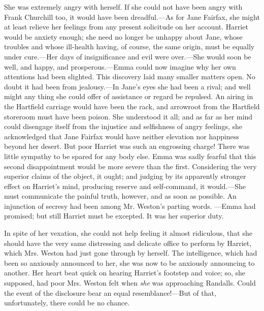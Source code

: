 She was extremely angry with herself. If she could not have been angry with Frank Churchill too, it would have been dreadful.---As for Jane Fairfax, she might at least relieve her feelings from any present solicitude on her account. Harriet would be anxiety enough; she need no longer be unhappy about Jane, whose troubles and whose ill-health having, of course, the same origin, must be equally under cure.---Her days of insignificance and evil were over.---She would soon be well, and happy, and prosperous.---Emma could now imagine why her own attentions had been slighted. This discovery laid many smaller matters open. No doubt it had been from jealousy.---In Jane's eyes she had been a rival; and well might any thing she could offer of assistance or regard be repulsed. An airing in the Hartfield carriage would have been the rack, and arrowroot from the Hartfield storeroom must have been poison. She understood it all; and as far as her mind could disengage itself from the injustice and selfishness of angry feelings, she acknowledged that Jane Fairfax would have neither elevation nor happiness beyond her desert. But poor Harriet was such an engrossing charge! There was little sympathy to be spared for any body else. Emma was sadly fearful that this second disappointment would be more severe than the first. Considering the very superior claims of the object, it ought; and judging by its apparently stronger effect on Harriet's mind, producing reserve and self-command, it would.---She must communicate the painful truth, however, and as soon as possible. An injunction of secresy had been among Mr. Weston's parting words. ---Emma had promised; but still Harriet must be excepted. It was her superior duty.

In spite of her vexation, she could not help feeling it almost ridiculous, that she should have the very same distressing and delicate office to perform by Harriet, which Mrs. Weston had just gone through by herself. The intelligence, which had been so anxiously announced to her, she was now to be anxiously announcing to another. Her heart beat quick on hearing Harriet's footstep and voice; so, she supposed, had poor Mrs. Weston felt when {\em she} was approaching Randalls. Could the event of the disclosure bear an equal resemblance!---But of that, unfortunately, there could be no chance.

